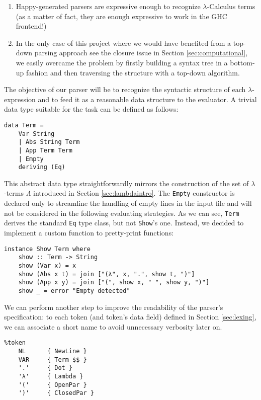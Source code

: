 \documentclass{article}
\begin{document}
\begin{enumerate}
    \item Happy-generated parsers are expressive enough to recognize $\lambda$-Calculus terms (as a matter of fact, they are enough expressive to work in the GHC frontend!)
    \item In the only case of this project where we would have benefited from a top-down parsing approach {see the closure issue in Section \ref{sec:computational}}, we easily overcame the problem by firstly building a syntax tree in a bottom-up fashion and then traversing the structure with a top-down algorithm.
\end{enumerate}

The objective of our parser will be to recognize the syntactic structure of each $\lambda$-expression and to feed it as a reasonable data structure to the evaluator. A trivial data type suitable for the task can be defined as follows:

\begin{lstlisting}
data Term =
    Var String
    | Abs String Term
    | App Term Term
    | Empty
    deriving (Eq)
\end{lstlisting}

This abstract data type straightforwardly mirrors the construction of the set of $\lambda$-terms $\Lambda$ introduced in Section \ref{sec:lambdaintro}. The \lstinline|Empty| constructor is declared only to streamline the handling of empty lines in the input file and will not be considered in the following evaluating strategies. As we can see, \lstinline|Term| derives the standard \lstinline|Eq| type class, but not \lstinline|Show|'s one. Instead, we decided to implement a custom function to pretty-print functions:

\begin{lstlisting}
instance Show Term where
    show :: Term -> String
    show (Var x) = x
    show (Abs x t) = join ["(λ", x, ".", show t, ")"]
    show (App x y) = join ["(", show x, " ", show y, ")"]
    show _ = error "Empty detected"
\end{lstlisting}

We can perform another step to improve the readability of the parser's specification: to each token (and token's data field) defined in Section \ref{sec:lexing}, we can associate a short name to avoid unnecessary verbosity later on.

\begin{lstlisting}
%token
    NL      { NewLine }
    VAR     { Term $$ }
    '.'     { Dot }
    'λ'     { Lambda }
    '('     { OpenPar }
    ')'     { ClosedPar }
\end{lstlisting}
\end{document}
